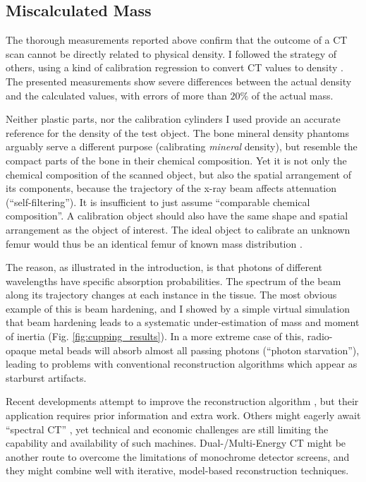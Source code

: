\subsection{Miscalculated Mass}
\label{sec:org3570f26}
The thorough measurements reported above confirm that the outcome of a CT scan cannot be directly related to physical density.
I followed the strategy of others, using a kind of calibration regression to convert CT values to density \citep{Mull1984,Phillips1997,DuPlessis2013,Durston2022,Fath2023}.
The presented measurements show severe differences between the actual density and the calculated values, with errors of more than \(20 \%\) of the actual mass.


Neither plastic parts, nor the calibration cylinders I used provide an accurate reference for the density of the test object.
The bone mineral density phantoms arguably serve a different purpose (calibrating \emph{mineral} density), but resemble the compact parts of the bone in their chemical composition.
Yet it is not only the chemical composition of the scanned object, but also the spatial arrangement of its components, because the trajectory of the x-ray beam affects attenuation (``self-filtering'').
It is insufficient to just assume ``comparable chemical composition''.
A calibration object should also have the same shape and spatial arrangement as the object of interest.
The ideal object to calibrate an unknown femur would thus be an identical femur of known mass distribution \citep[which is actually attempted in clinical tomography, cf.][]{Lennie2021}.


The reason, as illustrated in the introduction, is that photons of different wavelengths have specific absorption probabilities.
The spectrum of the beam along its trajectory changes at each instance in the tissue.
The most obvious example of this is beam hardening, and I showed by a simple virtual simulation that beam hardening leads to a systematic under-estimation of mass and moment of inertia (Fig. \ref{fig:cupping_results}).
In a more extreme case of this, radio-opaque metal beads will absorb almost all passing photons (``photon starvation''), leading to problems with conventional reconstruction algorithms which appear as starburst artifacts.


Recent developments attempt to improve the reconstruction algorithm \citep{Six2019,Frenkel2022,Yang2021,Batenburg2011}, but their application requires prior information and extra work.
Others might eagerly await ``spectral CT'' \citep{Liu2023}, yet technical and economic challenges are still limiting the capability and availability of such machines.
Dual-/Multi-Energy CT might be another route to overcome the limitations of monochrome detector screens, and they might combine well with iterative, model-based reconstruction techniques.


